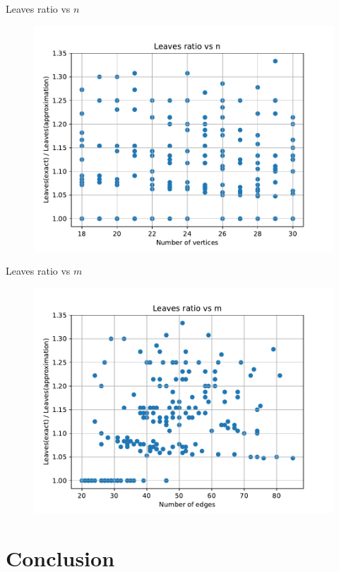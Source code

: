 \documentclass{beamer}
\begin{document}
\begin{frame}{Leaves ratio vs $n$}
    \begin{figure}
        \centering
        \includegraphics[width=0.9\linewidth]{leaves_ratio_vs_n.pdf} 
        \label{fig:my_label}
    \end{figure}
\end{frame}

\begin{frame}{Leaves ratio vs $m$}
    \begin{figure}
        \centering
        \includegraphics[width=0.9\linewidth]{leaves_ratio_vs_m.pdf} 
        \label{fig:my_label}
    \end{figure}
\end{frame}

\section{Conclusion}
\end{document}
